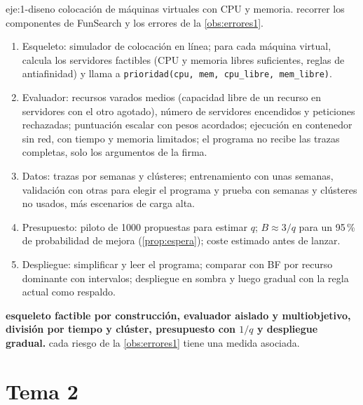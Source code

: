 \begin{solucion}{eje:1-diseno}
\datos colocación de máquinas virtuales con CPU y memoria.
\planteamiento recorrer los componentes de FunSearch y los errores de la \cref{obs:errores1}.
\pasos
\begin{enumerate}[label=\arabic*.]
  \item Esqueleto: simulador de colocación en línea; para cada máquina virtual, calcula los servidores factibles (CPU y memoria libres suficientes, reglas de antiafinidad) y llama a \texttt{prioridad(cpu, mem, cpu\_libre, mem\_libre)}.
  \item Evaluador: recursos varados medios (capacidad libre de un recurso en servidores con el otro agotado), número de servidores encendidos y peticiones rechazadas; puntuación escalar con pesos acordados; ejecución en contenedor sin red, con tiempo y memoria limitados; el programa no recibe las trazas completas, solo los argumentos de la firma.
  \item Datos: trazas por semanas y clústeres; entrenamiento con unas semanas, validación con otras para elegir el programa y prueba con semanas y clústeres no usados, más escenarios de carga alta.
  \item Presupuesto: piloto de 1000 propuestas para estimar $q$; $B\approx 3/q$ para un 95\,\% de probabilidad de mejora (\cref{prop:espera}); coste estimado antes de lanzar.
  \item Despliegue: simplificar y leer el programa; comparar con BF por recurso dominante con intervalos; despliegue en sombra y luego gradual con la regla actual como respaldo.
\end{enumerate}
\resultado \textbf{esqueleto factible por construcción, evaluador aislado y multiobjetivo, división por tiempo y clúster, presupuesto con $1/q$ y despliegue gradual.}
\comprobacion cada riesgo de la \cref{obs:errores1} tiene una medida asociada.
\end{solucion}

\section{Tema 2}

